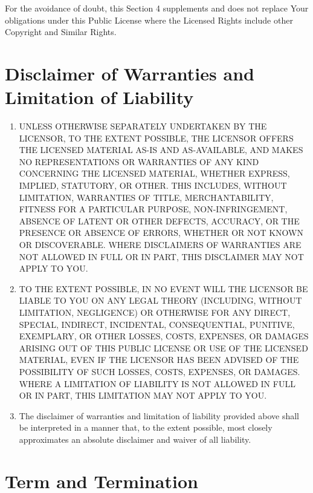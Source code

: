 For the avoidance of doubt, this Section 4 supplements and does not
replace Your obligations under this Public License where the Licensed
Rights include other Copyright and Similar Rights.

\section{Disclaimer of Warranties and Limitation of Liability}

\begin{enumerate}[label=\alph*.]

\item UNLESS OTHERWISE SEPARATELY UNDERTAKEN BY THE LICENSOR, TO THE
  EXTENT POSSIBLE, THE LICENSOR OFFERS THE LICENSED MATERIAL AS-IS AND
  AS-AVAILABLE, AND MAKES NO REPRESENTATIONS OR WARRANTIES OF ANY KIND
  CONCERNING THE LICENSED MATERIAL, WHETHER EXPRESS, IMPLIED,
  STATUTORY, OR OTHER. THIS INCLUDES, WITHOUT LIMITATION, WARRANTIES
  OF TITLE, MERCHANTABILITY, FITNESS FOR A PARTICULAR PURPOSE,
  NON-INFRINGEMENT, ABSENCE OF LATENT OR OTHER DEFECTS, ACCURACY, OR
  THE PRESENCE OR ABSENCE OF ERRORS, WHETHER OR NOT KNOWN OR
  DISCOVERABLE. WHERE DISCLAIMERS OF WARRANTIES ARE NOT ALLOWED IN
  FULL OR IN PART, THIS DISCLAIMER MAY NOT APPLY TO YOU.

\item TO THE EXTENT POSSIBLE, IN NO EVENT WILL THE LICENSOR BE LIABLE
  TO YOU ON ANY LEGAL THEORY (INCLUDING, WITHOUT LIMITATION,
  NEGLIGENCE) OR OTHERWISE FOR ANY DIRECT, SPECIAL, INDIRECT,
  INCIDENTAL, CONSEQUENTIAL, PUNITIVE, EXEMPLARY, OR OTHER LOSSES,
  COSTS, EXPENSES, OR DAMAGES ARISING OUT OF THIS PUBLIC LICENSE OR
  USE OF THE LICENSED MATERIAL, EVEN IF THE LICENSOR HAS BEEN ADVISED
  OF THE POSSIBILITY OF SUCH LOSSES, COSTS, EXPENSES, OR
  DAMAGES. WHERE A LIMITATION OF LIABILITY IS NOT ALLOWED IN FULL OR
  IN PART, THIS LIMITATION MAY NOT APPLY TO YOU.

\item The disclaimer of warranties and limitation of liability
  provided above shall be interpreted in a manner that, to the extent
  possible, most closely approximates an absolute disclaimer and
  waiver of all liability.
\end{enumerate}

\section{Term and Termination}

